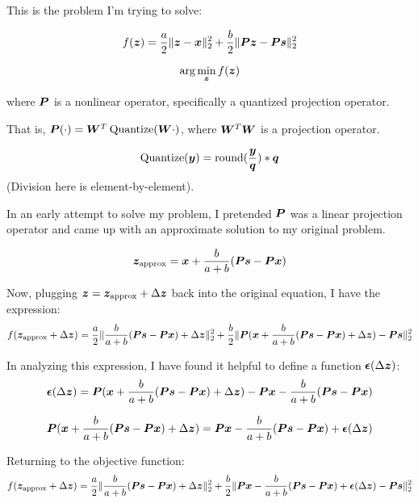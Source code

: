 \documentclass{article}
\begin{document}
This is the problem I'm trying to solve:

\begin{equation}
f(\bm{z}) =  \frac{a}{2}\|\bm{z} - \bm{x}\|_2^2 + \frac{b}{2}\|\bm{P}\bm{z} - \bm{P}\bm{s}\|_2^2
\end{equation}

\begin{equation}
\arg\min_{\bm{z}} f(\bm{z})
\end{equation}

where $\bm{P}$ is a nonlinear operator, specifically a quantized projection operator.

That is, $\bm{P}(\cdot) = \bm{W}^T\operatorname{Quantize}(\bm{W}\cdot)$, where $\bm{W}^T\bm{W}$ is a projection operator.

\begin{equation}
\operatorname{Quantize}(\bm{y}) = \operatorname{round}(\frac{\bm{y}}{\bm{q}})*\bm{q}
\end{equation}
(Division here is element-by-element).

In an early attempt to solve my problem, I pretended $\bm{P}$ was a linear projection operator and came up with an approximate solution to my original problem.

\begin{equation}
\bm{z}_{\text{approx}} = \bm{x} + \frac{b}{a + b}(\bm{P}\bm{s} - \bm{P}\bm{x})
\end{equation}

Now, plugging $\bm{z} = \bm{z}_{\text{approx}} + \Delta\bm{z}$ back into the original equation, I have the expression:
\begin{equation}
f(\bm{z}_{\text{approx}} + \Delta\bm{z}) = \frac{a}{2}\|\frac{b}{a + b}(\bm{P}\bm{s} - \bm{P}\bm{x}) + \Delta\bm{z}\|_2^2 + \frac{b}{2}\|\bm{P}(\bm{x} + \frac{b}{a + b}(\bm{P}\bm{s} - \bm{P}\bm{x}) + \Delta\bm{z}) - \bm{P}\bm{s}\|_2^2
\end{equation}


In analyzing this expression, I have found it helpful to define a function $\bm{\epsilon}(\Delta\bm{z})$:
\begin{equation}
\bm{\epsilon}(\Delta\bm{z}) = \bm{P}(\bm{x} + \frac{b}{a + b}(\bm{P}\bm{s} - \bm{P}\bm{x}) + \Delta\bm{z}) - \bm{P}\bm{x} - \frac{b}{a + b}(\bm{P}\bm{s} - \bm{P}\bm{x})
\end{equation}

\begin{equation}
\bm{P}(\bm{x} + \frac{b}{a + b}(\bm{P}\bm{s} - \bm{P}\bm{x}) + \Delta\bm{z}) = \bm{P}\bm{x} - \frac{b}{a + b}(\bm{P}\bm{s} - \bm{P}\bm{x}) +\bm{\epsilon}(\Delta\bm{z})
\end{equation}

Returning to the objective function:
\begin{equation}
f(\bm{z}_{\text{approx}} + \Delta\bm{z}) = \frac{a}{2}\|\frac{b}{a + b}(\bm{P}\bm{s} - \bm{P}\bm{x}) + \Delta\bm{z}\|_2^2 + \frac{b}{2}\|\bm{P}\bm{x} - \frac{b}{a + b}(\bm{P}\bm{s} - \bm{P}\bm{x}) +\bm{\epsilon}(\Delta\bm{z}) - \bm{P}\bm{s}\|_2^2
\end{equation}
\end{document}
